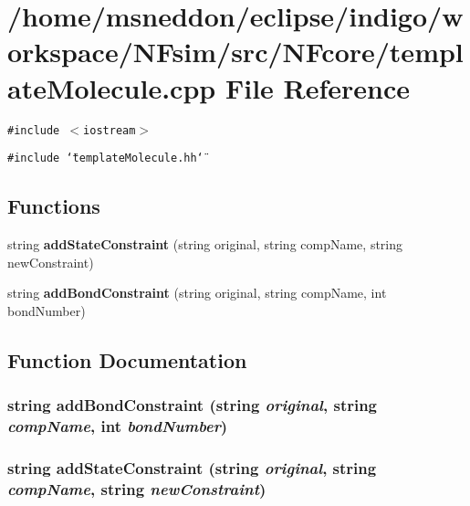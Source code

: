 \section{/home/msneddon/eclipse/indigo/workspace/NFsim/src/NFcore/templateMolecule.cpp File Reference}
\label{templateMolecule_8cpp}


{\tt \#include $<$iostream$>$}\par
{\tt \#include \char`\"{}templateMolecule.hh\char`\"{}}\par
\subsection*{Functions}
\begin{CompactItemize}
\item 
string {\bf addStateConstraint} (string original, string compName, string newConstraint)
\item 
string {\bf addBondConstraint} (string original, string compName, int bondNumber)
\end{CompactItemize}


\subsection{Function Documentation}
\subsubsection{\setlength{\rightskip}{0pt plus 5cm}string addBondConstraint (string {\em original}, string {\em compName}, int {\em bondNumber})}\label{templateMolecule_8cpp_7cb43d45a2c9b9949241f1351c3ed7b0}


\subsubsection{\setlength{\rightskip}{0pt plus 5cm}string addStateConstraint (string {\em original}, string {\em compName}, string {\em newConstraint})}\label{templateMolecule_8cpp_7c45e3f4b9c8d3d06577f5f30f661857}


